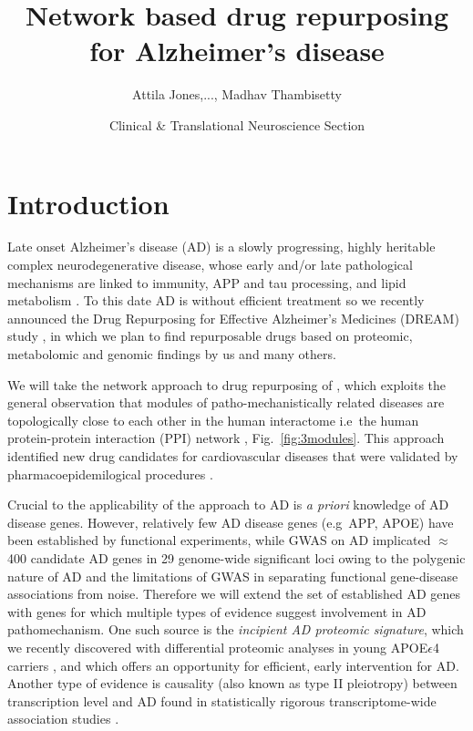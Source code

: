 \documentclass[letterpaper]{article}
\title{Network based drug repurposing for Alzheimer's disease}
\author{Attila Jones,..., Madhav Thambisetty}
\date{Clinical \& Translational Neuroscience Section}
\begin{document}
\maketitle

\section{Introduction}

Late onset Alzheimer's disease (AD) is a slowly progressing, highly heritable
complex neurodegenerative disease, whose early and/or late pathological
mechanisms are linked to immunity, APP and tau processing, and lipid
metabolism \citep{DeStrooper2016}.  To this date AD is without efficient
treatment so we recently announced the Drug Repurposing for Effective
Alzheimer's Medicines (DREAM) study \citep{Desai2020}, in which we plan to
find repurposable drugs based on proteomic, metabolomic and genomic findings
by us \citep{JacksonA.Roberts2021} and many others.

We will take the network approach to drug repurposing of \cite{Cheng2018},
which exploits the general observation that modules of patho-mechanistically
related diseases are topologically close to each other in the human
interactome i.e~the human protein-protein interaction (PPI) network
\citep{Menche2015a}, Fig.~\ref{fig:3modules}.  This approach identified new
drug candidates for cardiovascular diseases that were validated by
pharmacoepidemilogical procedures \citep{Cheng2018}.

Crucial to the applicability of the approach to AD is \emph{a priori}
knowledge of AD disease genes.  However, relatively few AD disease genes
(e.g~APP, APOE) have been established by functional experiments, while GWAS on
AD \citep{Jansen2019,Kunkle2019} implicated $\approx$ 400 candidate AD genes
in 29 genome-wide significant loci owing to the polygenic nature of AD and the
limitations of GWAS in separating functional gene-disease associations from
noise.  Therefore we will extend the set of established AD genes with genes
for which multiple types of evidence suggest involvement in AD pathomechanism.
One such source is the \emph{incipient AD proteomic signature}, which we
recently discovered with differential proteomic analyses in young
APOE$\epsilon$4 carriers \citep{JacksonA.Roberts2021}, and which offers an
opportunity for efficient, early intervention for AD. Another type of evidence
is causality (also known as type II pleiotropy) between transcription level
and AD found in statistically rigorous transcriptome-wide association studies
\citep{Baird2021,Gerring2020,Jansen2019,Kunkle2019}.
\end{document}
